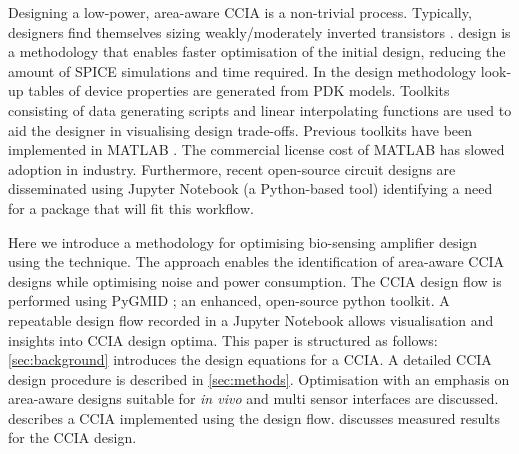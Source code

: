 Designing a low-power, area-aware CCIA is a non-trivial process. Typically, designers find themselves sizing weakly/moderately inverted transistors \cite{6015500}. \gmID design \cite{jespers2017systematic} is a methodology that enables faster optimisation of the initial design, reducing the amount of SPICE simulations and time required. In the \gmID design methodology look-up tables of device properties are generated from PDK models. Toolkits consisting of data generating scripts and linear interpolating functions are used to aid the designer in visualising design trade-offs. Previous toolkits have been implemented in MATLAB \cite{MurmannGMID}. The commercial license cost of MATLAB has slowed \gmID adoption in industry. Furthermore, recent open-source circuit designs are disseminated using Jupyter Notebook (a Python-based tool) \cite{herman2024versatility} identifying a need for a \gmID package that will fit this workflow.

Here we introduce a methodology for optimising bio-sensing amplifier design using the \gmID technique. The approach enables the identification of area-aware CCIA designs while optimising noise and power consumption. The CCIA design flow is performed using PyGMID \cite{O_Donnell_PyGMID}; an enhanced, open-source python \gmID toolkit. A repeatable design flow recorded in a Jupyter Notebook \cite{CCIA_GMID} allows visualisation and insights into CCIA design optima. This paper is structured as follows: \cref{sec:background} introduces the design equations for a CCIA. A detailed CCIA design procedure is described in \cref{sec:methods}. Optimisation with an emphasis on area-aware designs suitable for \textit{in vivo} and multi sensor interfaces are discussed.  describes a CCIA implemented using the \gmID design flow.  discusses measured results for the CCIA design.